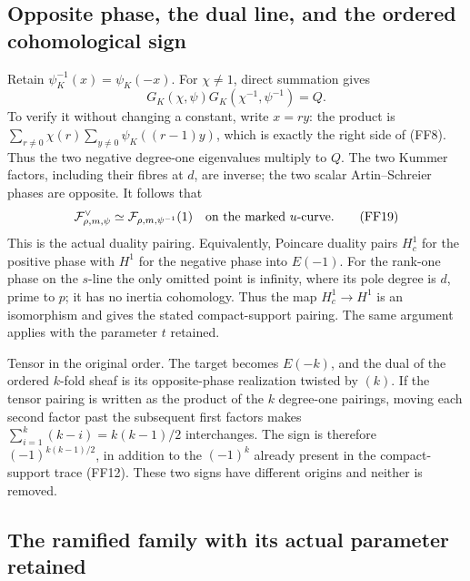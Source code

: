 \documentclass[11pt,a4paper]{article}
\theoremstyle{definition}
\begin{document}
\subsection{Opposite phase, the dual line, and the ordered cohomological sign}

Retain \(\psi^{-1}_K(x)=\psi_K(-x)\).
For \(\chi\ne1\), direct summation gives
\[
 G_K(\chi,\psi)G_K(\chi^{-1},\psi^{-1})=Q.              \tag{FF18}
\]
To verify it without changing a constant, write \(x=ry\):
the product is
\(\sum_{r\ne0}\chi(r)\sum_{y\ne0}\psi_K((r-1)y)\),
which is exactly the right side of (FF8).
Thus the two negative degree-one eigenvalues multiply to \(Q\).
The two Kummer factors, including their fibres at \(d\), are inverse;
the two scalar Artin--Schreier phases are opposite.  It follows that
\[
 \mathcal F_{\rho,m,\psi}^{\vee}
       \simeq\mathcal F_{\rho,m,\psi^{-1}}(1)
                       \quad\hbox{on the marked \(u\)-curve}.   \tag{FF19}
\]
This is the actual duality pairing.  Equivalently, Poincare duality
pairs \(H_c^1\) for the positive phase with \(H^1\) for the negative
phase into \(E(-1)\).  For the rank-one phase on the \(s\)-line the
only omitted point is infinity, where its pole degree is \(d\),
prime to \(p\); it has no inertia cohomology.  Thus the map
\(H_c^1\to H^1\) is an isomorphism and gives the stated
compact-support pairing.  The same argument applies with the
parameter \(t\) retained.

Tensor in the original order.  The target becomes \(E(-k)\),
and the dual of the ordered \(k\)-fold sheaf is its opposite-phase
realization twisted by \((k)\).  If the tensor pairing is written
as the product of the \(k\) degree-one pairings, moving each second
factor past the subsequent first factors makes
\(\sum_{i=1}^k(k-i)=k(k-1)/2\) interchanges.  The sign is therefore
\((-1)^{k(k-1)/2}\), in addition to the \((-1)^k\) already present
in the compact-support trace (FF12).  These two signs have different
origins and neither is removed.

\subsection{The ramified family with its actual parameter retained}
\end{document}
